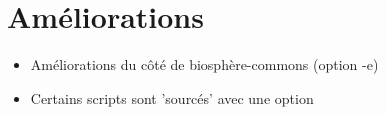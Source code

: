 \section{Améliorations}
\begin{itemize}
    \item Améliorations du côté de biosphère-commons (option -e) 
    \item Certains scripts sont 'sourcés' avec une option
\end{itemize}